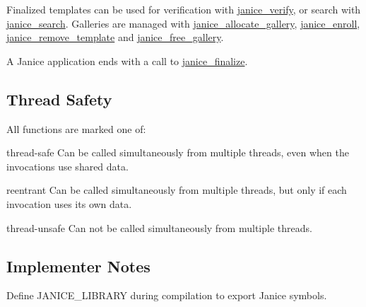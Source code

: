 Finalized templates can be used for verification with \hyperlink{group__janice_gafdbbe1f5e6346e5e84be26192e4561ac}{janice\+\_\+verify}, or search with \hyperlink{group__janice_ga073aa5f2133223c0b31ac3e78671836a}{janice\+\_\+search}. Galleries are managed with \hyperlink{group__janice_gad17bd59e58177b5f29f32f418ce77f71}{janice\+\_\+allocate\+\_\+gallery}, \hyperlink{group__janice_ga5ca354538d09d4abf4bd87d34222ecd1}{janice\+\_\+enroll}, \hyperlink{group__janice_gaf84120b70a7b932ee02ca2f3b131ee54}{janice\+\_\+remove\+\_\+template} and \hyperlink{group__janice_gad059b35e049028060025889a14fe6982}{janice\+\_\+free\+\_\+gallery}.

A Janice application ends with a call to \hyperlink{group__janice_ga3a2f0366f897c1168639b152b2cdf554}{janice\+\_\+finalize}.\hypertarget{group__janice_thread_safety}{}\subsection{Thread Safety}\label{group__janice_thread_safety}
All functions are marked one of\+:
\begin{DoxyItemize}
\item \label{group__janice_thread_safe}%
\hypertarget{group__janice_thread_safe}{}%
\begin{DoxyParagraph}{thread-\/safe}
Can be called simultaneously from multiple threads, even when the invocations use shared data.
\end{DoxyParagraph}

\item \label{group__janice_reentrant}%
\hypertarget{group__janice_reentrant}{}%
\begin{DoxyParagraph}{reentrant}
Can be called simultaneously from multiple threads, but only if each invocation uses its own data.
\end{DoxyParagraph}

\item \label{group__janice_thread_unsafe}%
\hypertarget{group__janice_thread_unsafe}{}%
\begin{DoxyParagraph}{thread-\/unsafe}
Can not be called simultaneously from multiple threads.
\end{DoxyParagraph}

\end{DoxyItemize}\hypertarget{group__janice_implementer_notes}{}\subsection{Implementer Notes}\label{group__janice_implementer_notes}
Define {\ttfamily J\+A\+N\+I\+C\+E\+\_\+\+L\+I\+B\+R\+A\+R\+Y} during compilation to export Janice symbols. 

